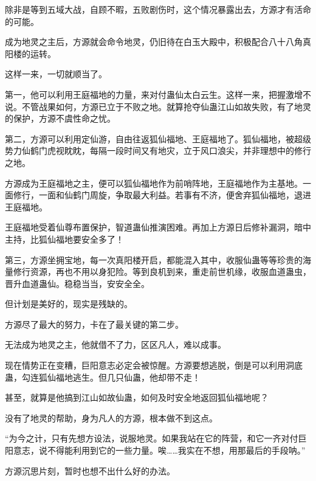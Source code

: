 \begin{this_body}
除非是等到五域大战，自顾不暇，五败剧伤时，这个情况暴露出去，方源才有活命的可能。

成为地灵之主后，方源就会命令地灵，仍旧待在白玉大殿中，积极配合八十八角真阳楼的运转。

这样一来，一切就顺当了。

第一，他可以利用王庭福地的力量，来对付蛊仙太白云生。这样一来，把握激增不说。不管战果如何，方源已立于不败之地。就算抢夺仙蛊江山如故失败，有了地灵的保护，方源不虞性命之忧。

第二，方源可以利用定仙游，自由往返狐仙福地、王庭福地了。狐仙福地，被超级势力仙鹤门虎视眈眈，每隔一段时间又有地灾，立于风口浪尖，并非理想中的修行之地。

方源成为王庭福地之主，便可以狐仙福地作为前哨阵地，王庭福地作为主基地。一面修行，一面和仙鹤门周旋，争取最大利益。若事有不济，便舍弃狐仙福地，退进王庭福地。

王庭福地受着仙尊布置保护，智道蛊仙推演困难。再加上方源日后修补漏洞，暗中主持，比狐仙福地要安全多了！

第三，方源坐拥宝地，每一次真阳楼开启，都能混入其中，收服仙蛊等等珍贵的海量修行资源，再也不用以身犯险。等到良机到来，重走前世机缘，收服血道蛊虫，晋升血道蛊仙。稳稳当当，安安全全。

但计划是美好的，现实是残缺的。

方源尽了最大的努力，卡在了最关键的第二步。

无法成为地灵之主，他就借不了力，区区凡人，难以成事。

现在情势正在变糟，巨阳意志必定会被惊醒。方源要想逃脱，倒是可以利用洞底蛊，勾连狐仙福地逃生。但几只仙蛊，他却带不走！

甚至，就算是他搞到江山如故仙蛊，如何及时安全地返回狐仙福地呢？

没有了地灵的帮助，身为凡人的方源，根本做不到这点。

“为今之计，只有先想方设法，说服地灵。如果我站在它的阵营，和它一齐对付巨阳意志，说不得能利用到它的一些力量。唉……我实在不想，用那最后的手段呐。”

方源沉思片刻，暂时也想不出什么好的办法。

\end{this_body}

